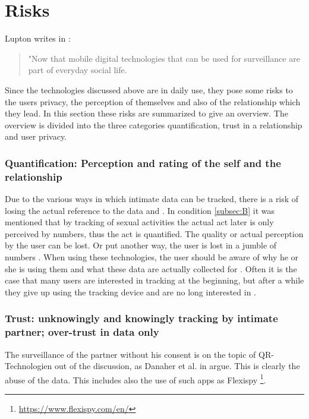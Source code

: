\section{Risks}
\label{sec:risks}
Lupton writes in \cite{doi:10.1080/13691058.2014.920528}:
\begin{quote}
	"Now that mobile digital technologies that can be used for surveillance are part of everyday social life.
\end{quote}
Since the technologies discussed above are in daily use, they pose some risks to the users privacy, the perception of themselves and also of the relationship which they lead.
In this section these risks are summarized to give an overview.
The overview is divided into the three categories quantification, trust in a relationship and user privacy.

\subsubsection{Quantification: Perception and rating of the self and the relationship}
Due to the various ways in which intimate data can be tracked, there is a risk of losing the actual reference to the data \cite{doi:10.1080/13691058.2014.920528} and \cite{lupton2016quantified}. In condition \ref{subsec:B} it was mentioned that by tracking of sexual activities the actual act later is only perceived by numbers, thus the act is quantified. The quality or actual perception by the user can be lost. Or put another way, the user is lost in a jumble of numbers \cite{kelly2017inevitable}.
When using these technologies, the user should be aware of why he or she is using them and what these data are actually collected for \cite{doi:10.1080/15265161.2017.1409823}. 
Often it is the case that many users are interested in tracking at the beginning, but after a while they give up using the tracking device and are no long interested in \cite{sjoklint2015complexities}.


\subsubsection{Trust: unknowingly and knowingly tracking by intimate partner; over-trust in data only}
The surveillance of the partner without his consent is on the topic of \acs{QR}-Technologien out of the discussion, as Danaher et al. in \cite{doi:10.1080/15265161.2017.1409823} argue. This is clearly the abuse of the data. This includes also the use of such apps as Flexispy \footnote{\url{https://www.flexispy.com/en/}}.

